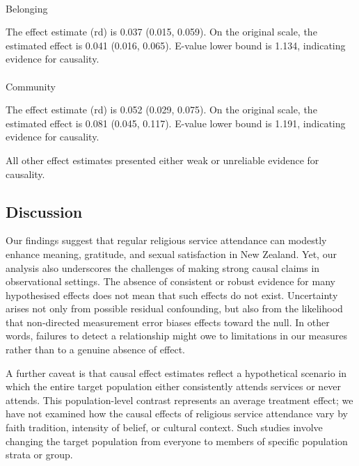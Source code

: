 \documentclass[
  single column]{article}
\makeatletter
\let\oldparagraph\paragraph
\renewcommand{\paragraph}{
    \@ifstar
      \xxxParagraphStar
      \xxxParagraphNoStar
  }
\newcommand{\xxxParagraphStar}[1]{\oldparagraph*{#1}\mbox{}}
\newcommand{\xxxParagraphNoStar}[1]{\oldparagraph{#1}\mbox{}}
\makeatother
\begin{document}
\paragraph{Belonging}\label{belonging}

The effect estimate (rd) is 0.037 (0.015, 0.059). On the original scale,
the estimated effect is 0.041 (0.016, 0.065). E-value lower bound is
1.134, indicating evidence for causality.

\paragraph{Community}\label{community}

The effect estimate (rd) is 0.052 (0.029, 0.075). On the original scale,
the estimated effect is 0.081 (0.045, 0.117). E-value lower bound is
1.191, indicating evidence for causality.

All other effect estimates presented either weak or unreliable evidence
for causality.

\newpage{}

\subsection{Discussion}\label{discussion}

Our findings suggest that regular religious service attendance can
modestly enhance meaning, gratitude, and sexual satisfaction in New
Zealand. Yet, our analysis also underscores the challenges of making
strong causal claims in observational settings. The absence of
consistent or robust evidence for many hypothesised effects does not
mean that such effects do not exist. Uncertainty arises not only from
possible residual confounding, but also from the likelihood that
non-directed measurement error biases effects toward the null. In other
words, failures to detect a relationship might owe to limitations in our
measures rather than to a genuine absence of effect.

A further caveat is that causal effect estimates reflect a hypothetical
scenario in which the entire target population either consistently
attends services or never attends. This population-level contrast
represents an average treatment effect; we have not examined how the
causal effects of religious service attendance vary by faith tradition,
intensity of belief, or cultural context. Such studies involve changing
the target population from everyone to members of specific population
strata or group.
\end{document}
